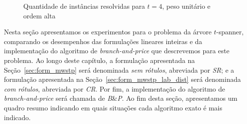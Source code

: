 \begin{figure}[t]%
    \centering
    \caption{Quantidade de instâncias resolvidas para $t = 4$, peso unitário e ordem alta}%
    \label{fig:tree_sf4_s40_50_unit}%
\end{figure}

Nesta seção apresentamos os experimentos para o problema da árvore
$t$-spanner, comparando os desempenhos das formulações lineares
inteiras e da implementação do algoritmo de \emph{branch-and-price} que
descrevemos
para este problema. Ao longo deste capítulo, a formulação apresentada
na Seção~\ref{sec:form_mwstp} será denominada \emph{sem rótulos},
abreviada por \emph{SR}; e a formulação apresentada na
Seção~\ref{sec:form_mwstp_lab_dist} será denominada \emph{com
  rótulos}, abreviada por \emph{CR}. Por fim, a implementação do
algoritmo de \emph{branch-and-price} será chamada de \emph{B}\&\emph{P}.
Ao fim desta seção, apresentamos um quadro
resumo indicando em quais situações cada algoritmo exato é mais
indicado.

